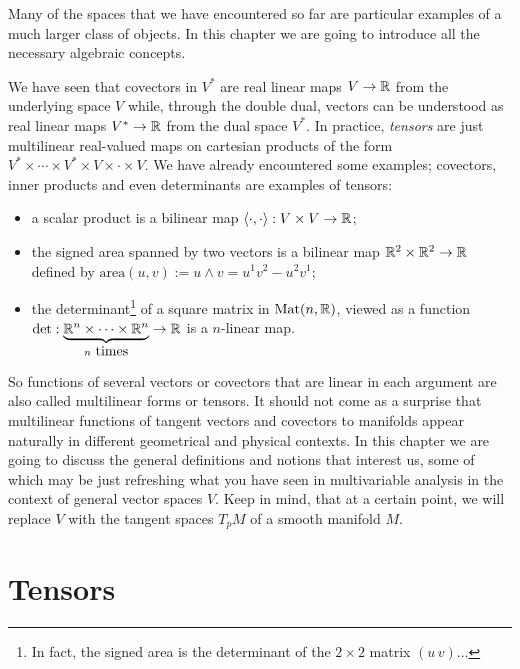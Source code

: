 Many of the spaces that we have encountered so far are particular examples of a much larger class of objects.
In this chapter we are going to introduce all the necessary algebraic concepts.

We have seen that covectors in $V^*$ are real linear maps $V\to\mathbb{R}$ from the underlying space $V$ while, through the double dual, vectors can be understood as real linear maps $V^*\to\mathbb{R}$ from the dual space $V^*$.
In practice, \emph{tensors} are just multilinear real-valued maps on cartesian products of the form $V^*\times \cdots \times V^* \times V \times \cdot \times V$.
We have already encountered some examples; covectors, inner products and even determinants are examples of tensors:
\begin{itemize}
  \item a scalar product is a bilinear map $\langle\cdot,\cdot\rangle:V\times V\to \mathbb{R}$;
  \item the signed area spanned by two vectors is a bilinear map $\mathbb{R}^2\times\mathbb{R}^2\to\mathbb{R}$ defined by $\mathrm{area}(u,v) := u\wedge v = u^1v^2-u^2v^1$;
  \item the determinant\footnote{In fact, the signed area is the determinant of the $2\times 2$ matrix $(u \, v)$...} of a square matrix in $\mathrm{Mat}(n, \mathbb{R})$, viewed as a function $\det: \LaTeXunderbrace{\R^n\times\cdots\times\R^n}_{n\mbox{ times}}\to\R$ is a $n$-linear map.
\end{itemize}

So functions of several vectors or covectors that are linear in each argument are also called multilinear forms or tensors.
It should not come as a surprise that multilinear functions of tangent vectors and covectors to manifolds appear naturally in different geometrical and physical contexts.
In this chapter we are going to discuss the general definitions and notions that interest us, some of which may be just refreshing what you have seen in multivariable analysis in the context of general vector spaces $V$.
Keep in mind, that at a certain point, we will replace $V$ with the tangent spaces $T_pM$ of a smooth manifold $M$.

\section{Tensors}

